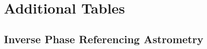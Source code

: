 \clearpage	
\section{Additional Tables}



\subsection{Inverse Phase Referencing Astrometry}\label{app:iprtables}

